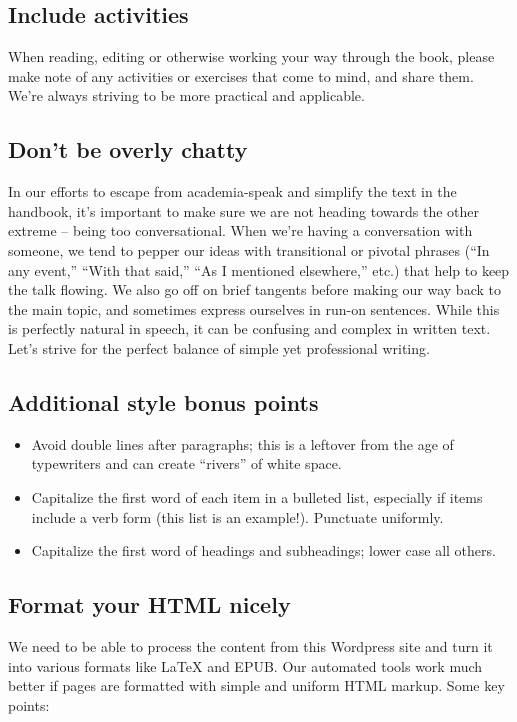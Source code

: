 \subsection{Include activities}

When reading, editing or otherwise working your way through the book,
please make note of any activities or exercises that come to mind, and
share them. We're always striving to be more practical and applicable.

\subsection{Don't be overly chatty}

In our efforts to escape from academia-speak and simplify the text in
the handbook, it's important to make sure we are not heading towards the
other extreme -- being too conversational. When we're having a
conversation with someone, we tend to pepper our ideas with transitional
or pivotal phrases (``In any event,'' ``With that said,'' ``As I
mentioned elsewhere,'' etc.) that help to keep the talk flowing. We also
go off on brief tangents before making our way back to the main topic,
and sometimes express ourselves in run-on sentences. While this is
perfectly natural in speech, it can be confusing and complex in written
text. Let's strive for the perfect balance of simple yet professional
writing.

\subsection{Additional style bonus points}

\begin{itemize}
\item
  Avoid double lines after paragraphs; this is a leftover from the age
  of typewriters and can create ``rivers'' of white space.
\item
  Capitalize the first word of each item in a bulleted list, especially
  if items include a verb form (this list is an example!). Punctuate
  uniformly.
\item
  Capitalize the first word of headings and subheadings; lower case all
  others.
\end{itemize}
\subsection{Format your HTML nicely}

We need to be able to process the content from this Wordpress site and
turn it into various formats like LaTeX and EPUB. Our automated tools
work much better if pages are formatted with simple and uniform HTML
markup. Some key points:

